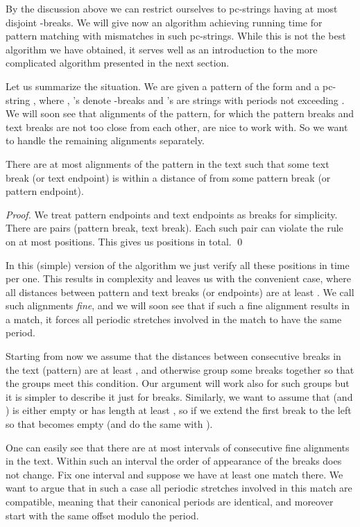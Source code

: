 \documentclass[runningheads]{llncs}
\begin{document}
By the discussion above we can restrict ourselves to pc-strings having at most  disjoint -breaks. We will give now an algorithm achieving  running time for pattern matching with  mismatches in such pc-strings. While this is not the best algorithm we have obtained, it serves well as an introduction to the more complicated  algorithm presented in the next section. 

Let us summarize the situation. We are given a pattern of the form  and a pc-string , where , 's denote -breaks and 's are strings with periods not exceeding . We will soon see that alignments of the pattern, for which the pattern breaks and text breaks are not too close from each other, are nice to work with. So we want to handle the remaining alignments separately.

\begin{proposition}\label{proposition:close_breaks}
There are at most  alignments of the pattern in the text such that some text break (or text endpoint) is within a distance of  from some pattern break (or pattern endpoint).
\end{proposition}

\begin{proof}
We treat pattern endpoints  and text endpoints as breaks for simplicity. There are  pairs (pattern break, text break). Each such pair can violate the rule on at most  positions. This gives us  positions in total.
\qed
\end{proof}

In this (simple) version of the algorithm we just verify all these  positions in  time per one. This results in  complexity and leaves us with the convenient case, where all distances between pattern and text breaks (or endpoints) are at least . We call such alignments {\it fine}, and we will
soon see that if such a fine alignment results in a match, it forces all periodic stretches involved in the match to have the same period.

Starting from now we assume that the distances between consecutive breaks in the text (pattern) are at least , and otherwise group some breaks together so that the groups meet this condition. Our argument will work also for such groups but it is simpler to describe it just for breaks. 
Similarly, we want to assume that  (and ) is either empty or has length at least , so if  we extend the first break to the left so that  becomes empty (and do the same with ). 

One can easily see that there are at most  intervals of consecutive fine alignments in the text. Within such an interval the order of appearance of the breaks does not change. Fix one interval and suppose we have at least one match there. We want to argue that in such a case all periodic stretches involved in this match are compatible, meaning
that their canonical periods are identical, and moreover start with the same offset modulo the period.
\end{document}
